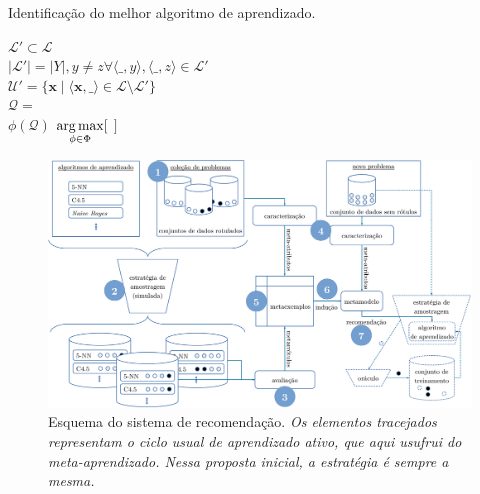 \begin{algoritmo}
\caption{Identificação do melhor algoritmo de aprendizado.}
\label{algbest}
  \small
{}
 {
  $\mathcal{L}' \subset \mathcal{L}$  \\
  $|\mathcal{L}'|=|Y|, y\neq z \forall \langle \_,y\rangle,\langle \_,z\rangle \in \mathcal{L}'$ \\
  $\mathcal{U}' = \{\bm{x} \mid \langle \bm{x}, \_ \rangle \in \mathcal{L} \setminus \mathcal{L}' \}$ \\
  $\mathcal{Q} = $  \\
  \Retorna $\phi(\mathcal{Q})$
}
\BlankLine
{} {
  \Retorna $\operatorname*{arg\,max}\limits_{\phi\in\Phi}[$  $]$\\  
}  
\end{algoritmo}

\begin{landscape}
\begin{figure}
\centering
    \includegraphics[scale=0.57]{images/meta.pdf}
	\caption[Esquema do sistema de recomendação.]{Esquema do sistema de recomendação. \textit{Os elementos tracejados representam o ciclo usual de aprendizado ativo, que aqui usufrui do meta-aprendizado. Nessa proposta inicial, a estratégia é sempre a mesma.}}
	\label{esquema}
\end{figure}
\end{landscape}

